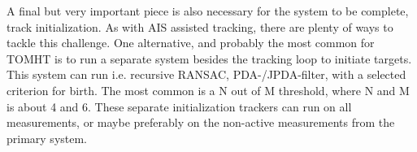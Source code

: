 A final but very important piece is also necessary for the system to  be complete, track initialization. As with AIS assisted tracking, there are plenty of ways to tackle this challenge. One alternative, and probably the most common for TOMHT is to run a separate system besides the tracking loop to initiate targets. This system can run i.e. recursive RANSAC, PDA-/JPDA-filter, with a selected criterion for birth. The most common is a N out of M threshold, where N and M is about 4 and 6. These separate initialization trackers can run on all measurements, or maybe preferably on the non-active measurements from the primary system. 
